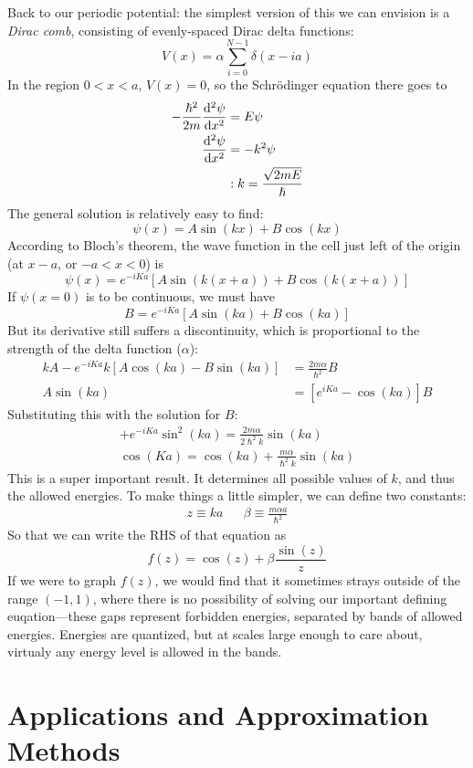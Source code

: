 \documentclass[a4paper]{article}
\begin{document}
Back to our periodic potential: the simplest version of this we can envision
is a \emph{Dirac comb}, consisting of evenly-spaced Dirac delta functions:
\[ V(x) = \alpha \sum_{i=0}^{N-1} \delta(x-ia) \]
In the region $0<x<a$, $V(x)=0$, so the Schr\"odinger equation there goes to
\begin{align*}
	-\frac{\hslash^2}{2m}\frac{\mathrm{d} ^2\psi}{\mathrm{d} x^2} &= E\psi\\
	\frac{\mathrm{d} ^2\psi}{\mathrm{d} x^2} &= -k^2\psi\\
	&:k=\frac{\sqrt{2mE}}{\hslash}
\end{align*}
The general solution is relatively easy to find:
\[ \psi(x) = A\sin(kx) + B\cos(kx) \]
According to Bloch's theorem, the wave function in the cell just left of the
origin (at $x-a$, or $-a<x<0$) is
\[ \psi(x) = e^{-iKa}[A\sin(k(x+a)) + B\cos(k(x+a))] \]
If $\psi(x=0)$ is to be continuous, we must have
\[ B = e^{-iKa}[A\sin(ka)+B\cos(ka)] \]
But its derivative still suffers a discontinuity, which is proportional to the
strength of the delta function ($\alpha$):
\begin{align*}
	kA - e^{-iKa}k[A\cos(ka)-B\sin(ka)]&=\frac{2m\alpha}{\hslash^2}B\\
	A\sin(ka) &= [e^{iKa}-\cos(ka)]B
\end{align*}
Substituting this with the solution for $B$:
\begin{gather*}
	[e^{iKa}-\cos(ka)][1-e^{-iKa}\cos(ka)]+e^{-iKa}\sin^2(ka) =
	\frac{2m\alpha}{2\hslash^2 k}\sin(ka)\\
	\cos(Ka)=\cos(ka)+\frac{m\alpha}{\hslash^2 k}\sin(ka)
\end{gather*}
This is a super important result. It determines all possible values of $k$,
and thus the allowed energies. To make things a little simpler, we can
define two constants:
\begin{align*}
	z \equiv ka && \beta \equiv \frac{m\alpha a}{\hslash^2}
\end{align*}
So that we can write the RHS of that equation as
\[ f(z) = \cos(z)+\beta\frac{\sin(z)}{z} \]
If we were to graph $f(z)$, we would find that it sometimes strays outside of
the range $(-1,1)$, where there is no possibility of solving our important 
defining euqation---these gaps represent forbidden energies, separated by bands
of allowed energies. Energies are quantized, but at scales large enough to
care about, virtualy any energy level is allowed in the bands.

\section{Applications and Approximation Methods}
\end{document}
